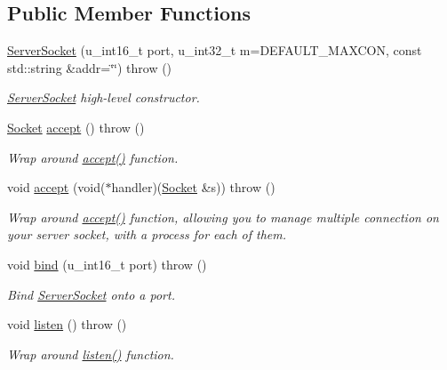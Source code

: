 \subsection*{Public Member Functions}
\begin{CompactItemize}
\item 
\hyperlink{classusock_1_1ServerSocket_0ac1908d4a4afb675715ae0ad994e870}{ServerSocket} (u\_\-int16\_\-t port, u\_\-int32\_\-t m=DEFAULT\_\-MAXCON, const std::string \&addr=\char`\"{}\char`\"{})  throw ()
\begin{CompactList}\small\item\em \hyperlink{classusock_1_1ServerSocket}{ServerSocket} high-level constructor. \item\end{CompactList}\item 
\hyperlink{classusock_1_1Socket}{Socket} \hyperlink{classusock_1_1ServerSocket_bf0477af52a725ced6afad86d7b3e794}{accept} ()  throw ()
\begin{CompactList}\small\item\em Wrap around \hyperlink{classusock_1_1ServerSocket_bf0477af52a725ced6afad86d7b3e794}{accept()} function. \item\end{CompactList}\item 
void \hyperlink{classusock_1_1ServerSocket_0ef5b201140a37c5d7c42aced9a45f2e}{accept} (void($\ast$handler)(\hyperlink{classusock_1_1Socket}{Socket} \&s))  throw ()
\begin{CompactList}\small\item\em Wrap around \hyperlink{classusock_1_1ServerSocket_bf0477af52a725ced6afad86d7b3e794}{accept()} function, allowing you to manage multiple connection on your server socket, with a process for each of them. \item\end{CompactList}\item 
void \hyperlink{classusock_1_1ServerSocket_9ecf37cae8379df6eaf366ab88df244a}{bind} (u\_\-int16\_\-t port)  throw ()
\begin{CompactList}\small\item\em Bind \hyperlink{classusock_1_1ServerSocket}{ServerSocket} onto a port. \item\end{CompactList}\item 
void \hyperlink{classusock_1_1ServerSocket_c6cd2070380b84275c5f69265c57713b}{listen} ()  throw ()
\begin{CompactList}\small\item\em Wrap around \hyperlink{classusock_1_1ServerSocket_c6cd2070380b84275c5f69265c57713b}{listen()} function. \item\end{CompactList}\end{CompactItemize}


